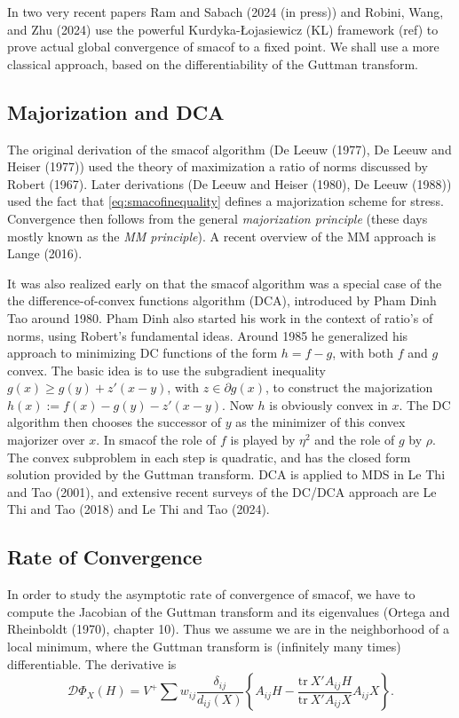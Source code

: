 \documentclass[
  12pt,
]{article}
\begin{document}
In two very recent
papers Ram and Sabach (2024 (in press)) and Robini, Wang, and Zhu (2024) use the powerful Kurdyka-Łojasiewicz (KL)
framework (ref)
to prove actual global convergence of smacof to a fixed point. We shall
use a more classical approach, based on the differentiability of the Guttman
transform.

\subsection{Majorization and DCA}\label{majorization-and-dca}

The original derivation of the smacof algorithm (De Leeuw (1977), De Leeuw and Heiser (1977))
used the theory of maximization a ratio of norms discussed by Robert (1967). Later
derivations (De Leeuw and Heiser (1980), De Leeuw (1988)) used the fact that \eqref{eq:smacofinequality} defines a majorization scheme for stress. Convergence
then follows from the general \emph{majorization principle} (these days mostly known
as the \emph{MM principle}). A recent overview of the MM approach is Lange (2016).

It was also realized early on that the smacof algorithm was a special case of the
the difference-of-convex functions algorithm (DCA), introduced by Pham Dinh Tao around
1980. Pham Dinh also started his work in the context of ratio's of norms, using
Robert's fundamental ideas. Around 1985 he generalized his approach to minimizing
DC functions of the form \(h=f-g\), with both \(f\) and \(g\) convex. The basic idea
is to use the subgradient inequality \(g(x)\geq g(y)+z'(x-y)\), with \(z\in\partial g(x)\),
to construct the majorization \(h(x):=f(x)-g(y)-z'(x-y)\). Now \(h\) is obviously convex in \(x\). The DC algorithm then chooses the successor of \(y\) as the minimizer of this convex majorizer over \(x\). In smacof the role of \(f\) is played by \(\eta^2\) and the role of \(g\) by \(\rho\). The convex subproblem in each step is quadratic, and has the closed form solution provided by the Guttman transform. DCA is applied to MDS in Le Thi and Tao (2001), and extensive recent surveys of the DC/DCA approach are Le Thi and Tao (2018) and Le Thi and Tao (2024).

\subsection{Rate of Convergence}\label{rate-of-convergence}

In order to study the asymptotic rate of convergence of smacof, we have to
compute the Jacobian of the Guttman transform and its eigenvalues (Ortega and Rheinboldt (1970), chapter 10). Thus we assume we are in the neighborhood of a local minimum, where the Guttman transform is (infinitely many times) differentiable. The derivative is
\begin{equation}
\mathcal{D}\Phi_X(H)=V^+\sum w_{ij}\frac{\delta_{ij}}{d_{ij}(X)}\left\{A_{ij}H-\frac{\text{tr}\ X'A_{ij}H}{ \text{tr}\ X'A_{ij}X}A_{ij}X\right\}.
\label{eq:jacobian}
\end{equation}
\end{document}
